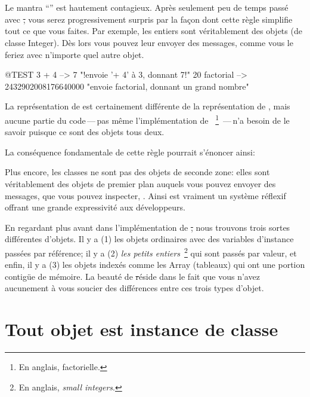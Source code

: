 \documentclass[a4paper,10pt,twoside]{book}
\begin{document}
\section{\Mantra}


Le mantra ``\mantra'' est hautement contagieux.
Apr\`es seulement peu de temps pass\'e avec \st, vous serez progressivement surpris par la fa\c{c}on dont cette r\`egle simplifie tout ce que vous faites.
Par exemple, les entiers sont v\'eritablement des objets (de classe Integer). D\`es lors vous pouvez leur envoyer des messages, comme vous le feriez avec n'importe quel autre objet.

\begin{code}{@TEST}
3 + 4            --> 7    "!envoie '+ 4' \`a 3, donnant 7!"
20 factorial  --> 2432902008176640000   "envoie factorial, donnant un grand nombre"
\end{code}

La repr\'esentation de  est certainement diff\'erente de la repr\'esentation de , mais aucune partie du code\,---\,pas m\^eme l'impl\'ementation de 
~\footnote{En anglais, factorielle.}
\,---\,n'a besoin de le savoir puisque ce sont des objets tous deux.

La cons\'equence fondamentale de cette r\`egle pourrait s'\'enoncer ainsi:

Plus encore, les classes ne sont pas des objets de seconde zone: elles sont v\'eritablement des objets de premier plan auquels vous pouvez envoyer des messages, que vous pouvez inspecter, \etc.
Ainsi \squeak est vraiment un syst\`eme r\'eflexif offrant une grande expressivit\'e
aux développeurs.

En regardant plus avant dans l'impl\'ementation de \st, nous trouvons
trois sortes diff\'erentes d'objets. Il y a (1) les objets ordinaires
avec des variables d'instance pass\'ees par r\'ef\'erence; il y a (2)
\emph{les petits entiers}~\footnote{En anglais, \emph{small
    integers}.} qui sont pass\'es par valeur, et enfin, il y a (3) les
objets 
index\'es comme les Array (tableaux) qui ont une portion contig\"ue de m\'emoire. La beaut\'e de \st r\'eside 
dans le fait que vous n'avez aucunement \`a vous soucier des diff\'erences entre ces trois types
d'objet.


\section{Tout objet est instance de classe}
\end{document}
